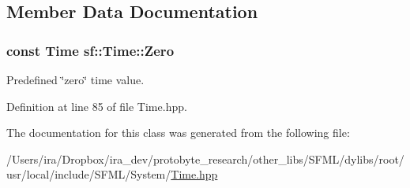 \subsection{Member Data Documentation}
\hypertarget{classsf_1_1_time_a8db127b632fa8da21550e7282af11fa0}{
\subsubsection[{Zero}]{\setlength{\rightskip}{0pt plus 5cm}const {\bf Time} sf\-::\-Time\-::\-Zero\hspace{0.3cm}{\ttfamily [static]}}}\label{classsf_1_1_time_a8db127b632fa8da21550e7282af11fa0}


Predefined \char`\"{}zero\char`\"{} time value. 



Definition at line 85 of file Time.\-hpp.



The documentation for this class was generated from the following file\-:\begin{DoxyCompactItemize}
\item 
/\-Users/ira/\-Dropbox/ira\-\_\-dev/protobyte\-\_\-research/other\-\_\-libs/\-S\-F\-M\-L/dylibs/root/usr/local/include/\-S\-F\-M\-L/\-System/\hyperlink{_time_8hpp}{Time.\-hpp}\end{DoxyCompactItemize}
